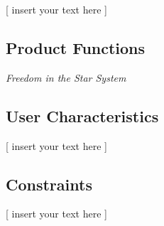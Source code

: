 \documentclass[twoside,letterpaper]{article}
\begin{document}
[ insert your text here ]

\subsection{Product Functions}

\textit{Freedom in the Star System} 

\subsection{User Characteristics}

[ insert your text here ] %

\subsection{Constraints}

[ insert your text here ]%
\end{document}
